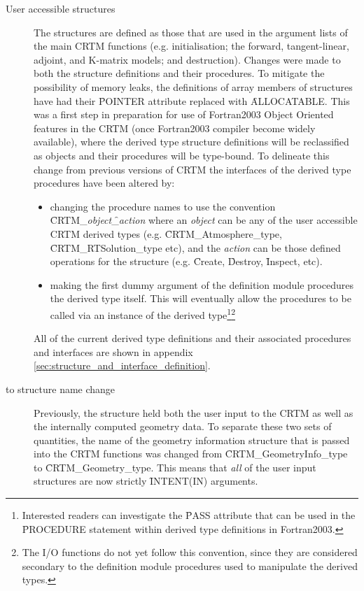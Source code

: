 \begin{description}
\item[User accessible structures] The structures are defined as those that are used in the argument lists of the main CRTM functions (e.g. initialisation; the forward, tangent-linear, adjoint, and K-matrix models; and destruction). Changes were made to both the structure definitions and their procedures. To mitigate the possibility of memory leaks, the definitions of array members of structures have had their \f{POINTER} attribute replaced with \f{ALLOCATABLE}. This was a first step in preparation for use of Fortran2003 Object Oriented features in the CRTM (once Fortran2003 compiler become widely available), where the derived type structure definitions will be reclassified as objects and their procedures will be type-bound. To delineate this change from previous versions of CRTM the interfaces of the derived type procedures have been altered by:
  \begin{itemize}
  \item changing the procedure names to use the convention \f{CRTM\_}\textit{object}\f{\_}\textit{action} where an \textit{object} can be any of the user accessible CRTM derived types (e.g. \f{CRTM\_Atmosphere\_type}, \f{CRTM\_RTSolution\_type} etc), and the \textit{action} can be those defined operations for the structure (e.g. \f{Create}, \f{Destroy}, \f{Inspect}, etc).
  \item making the first dummy argument of the definition module procedures the derived type itself. This will eventually allow the procedures to be called via an instance of the derived type\footnote{Interested readers can investigate the \f{PASS} attribute that can be used in the \f{PROCEDURE} statement within derived type definitions in Fortran2003.}\footnote{The I/O functions do not yet follow this convention, since they are considered secondary to the definition module procedures used to manipulate the derived types.}
  \end{itemize}
  All of the current derived type definitions and their associated procedures and interfaces are shown in appendix \ref{sec:structure_and_interface_definition}.

\item[\GeometryInfo{} to \Geometry{} structure name change] Previously, the \GeometryInfo{} structure held both the user input to the CRTM as well as the internally computed geometry data. To separate these two sets of quantities, the name of the geometry information structure that is passed into the CRTM functions was changed from \f{CRTM\_GeometryInfo\_type} to \f{CRTM\_Geometry\_type}. This means that \emph{all} of the user input structures are now strictly \f{INTENT(IN)} arguments.


\end{description}

